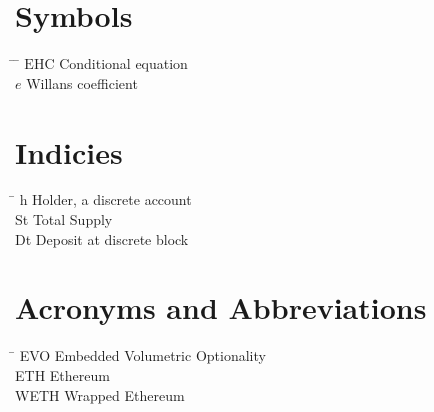 \section*{Symbols}
\begin{tabbing}
 \hspace*{1.6cm} \= \hspace*{8cm} \= \kill
$\mathrm{EHC}$ \> Conditional equation \> [$-$] \\[0.5ex]
$e$ \> Willans coefficient \> [$-$] \\
\end{tabbing}


\section*{Indicies}
\begin{tabbing}
 \hspace*{1.6cm}  \= \kill
 h \> Holder, a discrete account \\[0.5ex]
  St \> Total Supply \\[0.5ex]
  Dt \> Deposit at discrete block
\end{tabbing}

\section*{Acronyms and Abbreviations}
\begin{tabbing}
 \hspace*{1.6cm}  \= \kill
 EVO \> Embedded Volumetric Optionality \\[0.5ex]
 ETH \> Ethereum \\[0.5ex]
 WETH \> Wrapped Ethereum
\end{tabbing}

 \cleardoublepage

